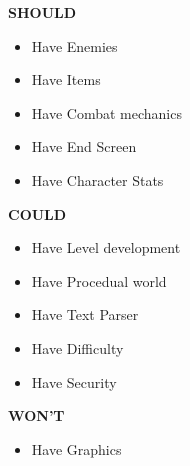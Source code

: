 \textbf{SHOULD}
\begin{itemize}

\item Have Enemies
\item Have Items
\item Have Combat mechanics
\item Have End Screen
\item Have Character Stats
 
\end{itemize}

\textbf{COULD}

\begin{itemize}

\item Have Level development
\item Have Procedual world
\item Have Text Parser
\item Have Difficulty
\item Have Security

\end{itemize}

\textbf{WON'T}
\begin{itemize}
\item Have Graphics
\end{itemize}

 